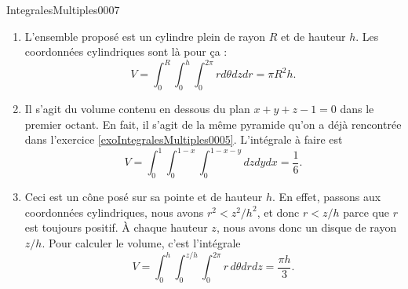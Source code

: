 \begin{corrige}{IntegralesMultiples0007}
\begin{enumerate}
		\item
			L'ensemble proposé est un cylindre plein de rayon $R$ et de hauteur $h$. Les coordonnées cylindriques sont là pour ça :
			\begin{equation}
				V=\int_0^R\int_0^h\int_0^{2\pi} rd\theta dzdr=\pi R^2 h.
			\end{equation}
		\item
			Il s'agit du volume contenu en dessous du plan $x+y+z-1=0$ dans le premier octant. En fait, il s'agit de la même pyramide qu'on a déjà rencontrée dans l'exercice \ref{exoIntegralesMultiples0005}. L'intégrale à faire est
			\begin{equation}
				V=\int_0^1\int_0^{1-x}\int_0^{1-x-y}dzdydx=\frac{1}{ 6 }.
			\end{equation}
		\item
			Ceci est un cône posé sur sa pointe et de hauteur $h$. En effet, passons aux coordonnées cylindriques, nous avons $r^2<z^2/h^2$, et donc $r<z/h$ parce que $r$ est toujours positif. À chaque hauteur $z$, nous avons donc un disque de rayon $z/h$. Pour calculer le volume, c'est l'intégrale
			\begin{equation}
				V=\int_0^h\int_0^{z/h}\int_0^{2\pi} r\,d\theta drdz=\frac{ \pi h }{ 3 }.
			\end{equation}
			
	\end{enumerate}
	
\end{corrige}
